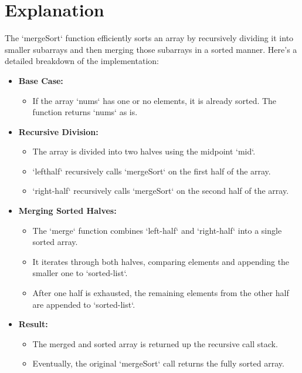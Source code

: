 \section*{Explanation}
The `mergeSort` function efficiently sorts an array by recursively dividing it into smaller subarrays and then merging those subarrays in a sorted manner. Here's a detailed breakdown of the implementation:

\begin{itemize}
    \item \textbf{Base Case:}
    \begin{itemize}
        \item If the array `nums` has one or no elements, it is already sorted. The function returns `nums` as is.
    \end{itemize}
    
    \item \textbf{Recursive Division:}
    \begin{itemize}
        \item The array is divided into two halves using the midpoint `mid`.
        \item `lefthalf` recursively calls `mergeSort` on the first half of the array.
        \item `right-half` recursively calls `mergeSort` on the second half of the array.
    \end{itemize}
    
    \item \textbf{Merging Sorted Halves:}
    \begin{itemize}
        \item The `merge` function combines `left-half` and `right-half` into a single sorted array.
        \item It iterates through both halves, comparing elements and appending the smaller one to `sorted-list`.
        \item After one half is exhausted, the remaining elements from the other half are appended to `sorted-list`.
    \end{itemize}
    
    \item \textbf{Result:}
    \begin{itemize}
        \item The merged and sorted array is returned up the recursive call stack.
        \item Eventually, the original `mergeSort` call returns the fully sorted array.
    \end{itemize}
\end{itemize}

